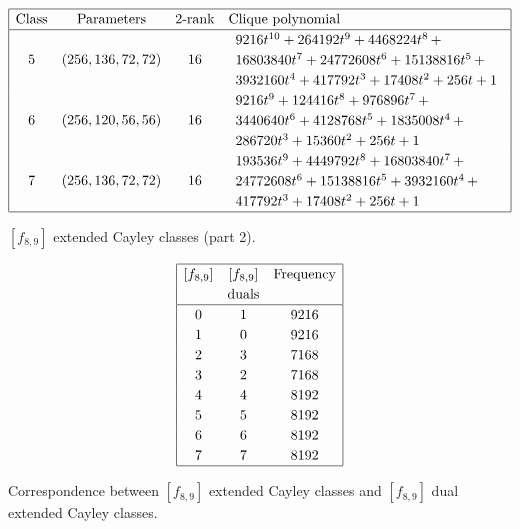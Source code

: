 \documentclass[12pt,a4paper]{article}
\begin{document}
\begin{table}[!bhpt] %
\small{}
\begin{align*}
\def\arraystretch{1.2}
\begin{array}{|cccl|}
\hline
\text{Class} &
\text{Parameters} &
\text{2-rank} &
\text{Clique polynomial}
\\
\hline
5 &
(256, 136, 72, 72) &
16 &
\begin{array}{l}
9216t^{10} + 264192t^{9} + 4468224t^{8}
\,+
\\
 16803840t^{7} + 24772608t^{6} + 15138816t^{5}
\,+
\\
 3932160t^{4} + 417792t^{3} + 17408t^{2} + 256t + 1
\end{array}
\\
6 &
(256, 120, 56, 56) &
16 &
\begin{array}{l}
9216t^{9} + 124416t^{8} + 976896t^{7}
\,+
\\
 3440640t^{6} + 4128768t^{5} + 1835008t^{4}
\,+
\\
 286720t^{3} + 15360t^{2} + 256t + 1
\end{array}
\\
7 &
(256, 136, 72, 72) &
16 &
\begin{array}{l}
193536t^{9} + 4449792t^{8} + 16803840t^{7}
\,+
\\
 24772608t^{6} + 15138816t^{5} + 3932160t^{4}
\,+
\\
 417792t^{3} + 17408t^{2} + 256t + 1
\end{array}
\\
\hline
\end{array}
\end{align*}
\caption{$[f_{8,9}]$ extended Cayley classes (part 2).}
\label{tab-c8_9_EC_classes_2}
\end{table}

\begin{table}
\small{}
\begin{align*}
\def\arraystretch{1.2}
\begin{array}{|ccc|}
\hline
[f_{8,9}] &
[f_{8,9}] &
\text{Frequency}
\\
&
\text{duals} &
\\
\hline
0 &   1 & 9216
\\
1 &   0 & 9216
\\
2 &   3 & 7168
\\
3 &   2 & 7168
\\
4 &   4 & 8192
\\
5 &   5 & 8192
\\
6 &   6 & 8192
\\
7 &   7 & 8192
\\
\hline
\end{array}
\end{align*}
\caption{Correspondence between $[f_{8,9}]$ extended Cayley classes and $[f_{8,9}]$ dual extended Cayley classes.}
\label{tab-c8_9-dual-EC_classes}
\end{table}
\end{document}
